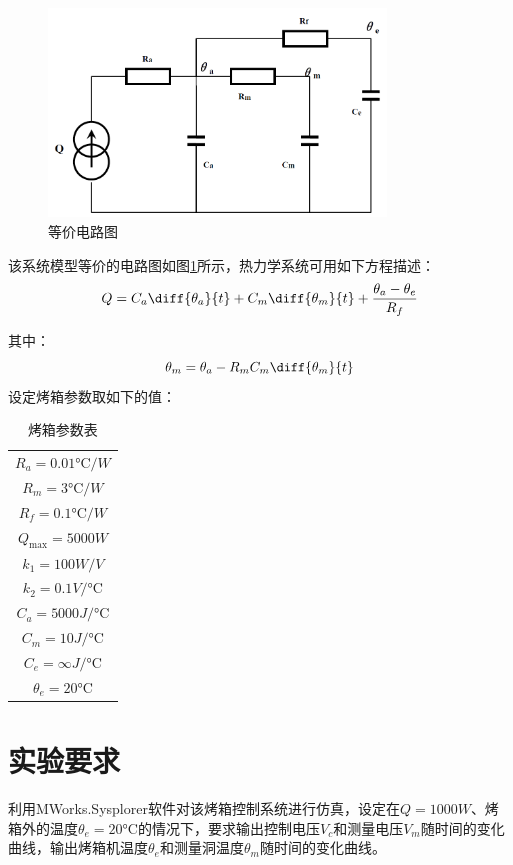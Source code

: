 \documentclass[11pt]{article}
\begin{document}
\begin{figure}[H]
  \centering
  \includegraphics[width=0.8\textwidth]{等价电路图.png}
  \caption{等价电路图}
  \label{fig:等价电路图}
\end{figure}
该系统模型等价的电路图如图\ref{fig:等价电路图}所示，热力学系统可用如下方程描述：
\begin{equation}
  Q=C_a\diff{\theta_a}{t}+C_m\diff{\theta_m}{t}+\frac{\theta_a-\theta_e}{R_f}
  \label{eq:烤箱热力学方程}
\end{equation}\par
其中：
\begin{equation*}
  \theta_m=\theta_a-R_mC_m\diff{\theta_m}{t}
\end{equation*}
设定烤箱参数取如下的值：
\begin{table}[H]
  \centering
  \renewcommand{\arraystretch}{1.5}
  \caption{烤箱参数表}
  \begin{tabular}{c}
    $R_a=0.01\unit{\celsius/W}$   \\
    $R_m=3\unit{\celsius/W}$      \\
    $R_f=0.1\unit{\celsius/W}$    \\
    $Q_\mathrm{max}=5000\unit{W}$ \\
    $k_1=100\unit{W/V}$           \\
    $k_2=0.1\unit{V/\celsius}$    \\
    $C_a=5000\unit{J/\celsius}$   \\
    $C_m=10\unit{J/\celsius}$     \\
    $C_e=\infty\unit{J/\celsius}$ \\
    $\theta_e=20\unit{\celsius}$  \\
  \end{tabular}
\end{table}
\section{实验要求}
利用MWorks.Sysplorer软件对该烤箱控制系统进行仿真，设定在$Q=1000\unit{W}$、烤箱外的温度$\theta_e=20\unit{\celsius}$的情况下，要求输出控制电压$V_c$和测量电压$V_m$随时间的变化曲线，输出烤箱机温度$\theta_e$和测量洞温度$\theta_m$随时间的变化曲线。
\end{document}
